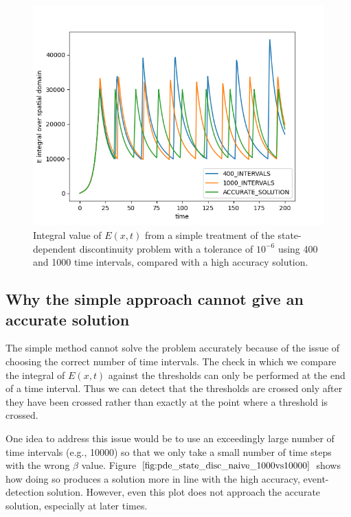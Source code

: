 \begin{figure}[H]
\centering
\includegraphics[width=0.7\linewidth]{./figures/pde_state_disc_naive_400vs1000}
\caption{Integral value of $E(x, t)$ from a simple treatment of the state-dependent discontinuity problem with a tolerance of $10^{-6}$ using 400 and 1000 time intervals, compared with a high accuracy solution.}
\label{fig:pde_state_disc_naive_400vs1000}
\end{figure}

\subsection{Why the simple approach cannot give an accurate solution}
\label{subsubsection:pde_state_naive_always_inaccurate}
The simple method cannot solve the problem accurately because of the issue of choosing the correct number of time intervals. The check in which we compare the integral of $E(x, t)$ against the thresholds can only be performed at the end of a time interval. Thus we can detect that the thresholds are crossed only after they have been crossed rather than exactly at the point where a threshold is crossed.

One idea to address this issue would be to use an exceedingly large number of time intervals (e.g., 10000) so that we only take a small number of time steps with the wrong $\beta$ value. Figure $\ref{fig:pde_state_disc_naive_1000vs10000}$ shows how doing so produces a solution more in line with the high accuracy, event-detection solution. However, even this plot does not approach the accurate solution, especially at later times. 

